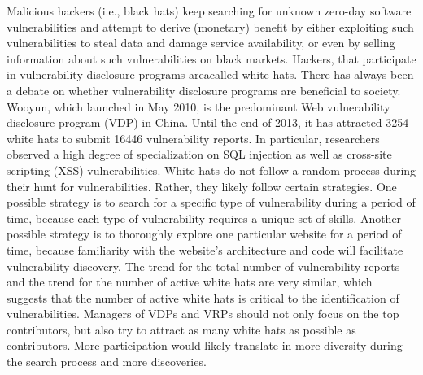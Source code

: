 \documentclass[14pt]{article}
\begin{document}
	Malicious hackers (i.e., black hats) keep searching for unknown zero-day software vulnerabilities and attempt to derive (monetary) beneﬁt by either exploiting such vulnerabilities to steal data and damage service availability, or even by selling information about such vulnerabilities on black markets. Hackers, that participate in vulnerability disclosure programs areacalled white hats. There has always been a debate on whether vulnerability disclosure programs are beneﬁcial to society. Wooyun, which launched in May 2010, is the predominant Web vulnerability disclosure program (VDP) in China. Until the end of 2013, it has attracted 3254 white hats to submit 16446 vulnerability reports. In particular, researchers observed a high degree of specialization on SQL injection as well as cross-site scripting (XSS) vulnerabilities. White hats do not follow a random process during their hunt for vulnerabilities. Rather, they likely follow certain strategies. One possible strategy is to search for a speciﬁc type of vulnerability during a period of time, because each type of vulnerability requires a unique set of skills. Another possible strategy is to thoroughly explore one particular website for a period of time, because familiarity with the website’s architecture and code will facilitate vulnerability discovery. The trend for the total number of vulnerability reports and the trend for the number of active white hats are very similar, which suggests that the number of active white hats is critical to the identiﬁcation of vulnerabilities. Managers of VDPs and VRPs should not only focus on the top contributors, but also try to attract as many white hats as possible as contributors. More participation would likely translate in more diversity during the search process and more discoveries.
\end{document}
